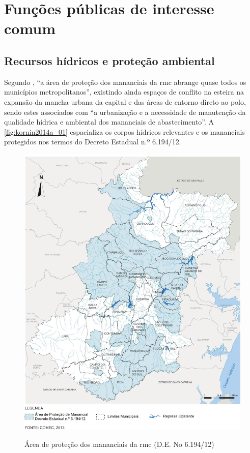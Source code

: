 	\chapter{Funções públicas de interesse comum}
	
	\section{Recursos hídricos e proteção ambiental}
	
	Segundo , ``a área de proteção dos mananciais da \gls{rmc} abrange quase todos os municípios metropolitanos'', existindo ainda espaços de conflito na esteira na expansão da mancha urbana da capital e das áreas de entorno direto ao polo, sendo estes associados com ``a urbanização e a necessidade de manutenção da qualidade hídrica e ambiental dos mananciais de abastecimento''. A \autoref{fig:kornin2014a_01} espacializa os corpos hídricos relevantes e os mananciais protegidos nos termos do Decreto Estadual n.º 6.194/12.
	
	\begin{figure}
		\centering
		\caption{Área de proteção dos mananciais da \gls{rmc} (D.E. No 6.194/12)}
		\includegraphics[width=1.0\linewidth]{img/kornin2014a_01}
		\label{fig:kornin2014a_01}
	\end{figure}

